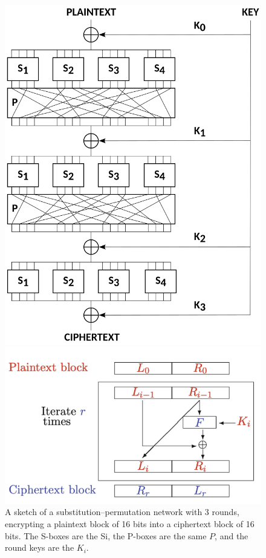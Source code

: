 \begin{figure}[h!]
    \centering
    \begin{minipage}[t]{0.35\textwidth}
        \centering
        \vspace{0pt} %
        \includegraphics[width=\textwidth]{img/spn.png}
        \caption{A sketch of a substitution–permutation network with 3 rounds, encrypting a plaintext block of 16 bits into a ciphertext block of 16 bits. The S-boxes are the Si, the P-boxes are the same $P$, and the round keys are the $K_i$.}
        \label{fig:spn}
    \end{minipage}
    \hfill
    \begin{minipage}[t]{0.45\textwidth}
        \vspace{0pt} %
        \includegraphics[width=\textwidth]{img/feistel.png}

\end{minipage}
\end{figure}
